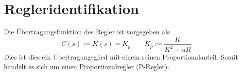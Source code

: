 \section{Regleridentifikation}
Die Übertragungsfunktion des Regler ist vorgegeben als
\[
	C(s) := K(s) = K_p	\qquad K_p := \frac{K}{K^2 + \alpha R}
\]
Dies ist dies ein Übertragungsglied mit einem reinen Proportionalanteil.
Somit handelt es sich um einen Proportionalregler (P-Regler).
